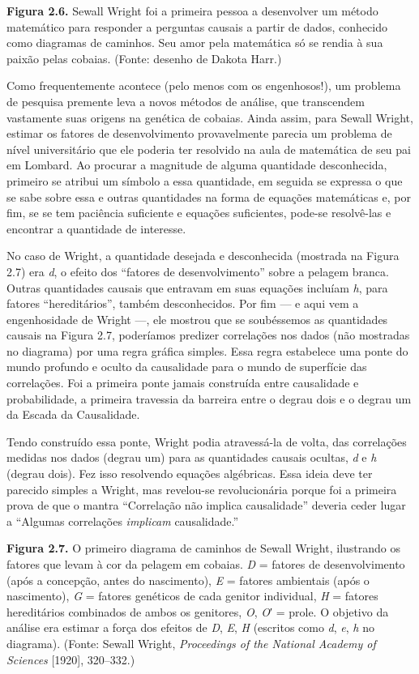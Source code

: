 \documentclass[11pt,a5paper,twoside]{book}
\begin{document}
\textbf{Figura 2.6.} Sewall Wright foi a primeira pessoa a desenvolver um método matemático para responder a perguntas causais a partir de dados, conhecido como diagramas de caminhos. Seu amor pela matemática só se rendia à sua paixão pelas cobaias. (Fonte: desenho de Dakota Harr.)

Como frequentemente acontece (pelo menos com os engenhosos!), um problema de pesquisa premente leva a novos métodos de análise, que transcendem vastamente suas origens na genética de cobaias. Ainda assim, para Sewall Wright, estimar os fatores de desenvolvimento provavelmente parecia um problema de nível universitário que ele poderia ter resolvido na aula de matemática de seu pai em Lombard. Ao procurar a magnitude de alguma quantidade desconhecida, primeiro se atribui um símbolo a essa quantidade, em seguida se expressa o que se sabe sobre essa e outras quantidades na forma de equações matemáticas e, por fim, se se tem paciência suficiente e equações suficientes, pode-se resolvê-las e encontrar a quantidade de interesse.

No caso de Wright, a quantidade desejada e desconhecida (mostrada na Figura 2.7) era \textit{d}, o efeito dos “fatores de desenvolvimento” sobre a pelagem branca. Outras quantidades causais que entravam em suas equações incluíam \textit{h}, para fatores “hereditários”, também desconhecidos. Por fim — e aqui vem a engenhosidade de Wright —, ele mostrou que se soubéssemos as quantidades causais na Figura 2.7, poderíamos predizer correlações nos dados (não mostradas no diagrama) por uma regra gráfica simples. Essa regra estabelece uma ponte do mundo profundo e oculto da causalidade para o mundo de superfície das correlações. Foi a primeira ponte jamais construída entre causalidade e probabilidade, a primeira travessia da barreira entre o degrau dois e o degrau um da Escada da Causalidade.

Tendo construído essa ponte, Wright podia atravessá-la de volta, das correlações medidas nos dados (degrau um) para as quantidades causais ocultas, \textit{d} e \textit{h} (degrau dois). Fez isso resolvendo equações algébricas. Essa ideia deve ter parecido simples a Wright, mas revelou-se revolucionária porque foi a primeira prova de que o mantra “Correlação não implica causalidade” deveria ceder lugar a “Algumas correlações \textit{implicam} causalidade.”

\textbf{Figura 2.7.} O primeiro diagrama de caminhos de Sewall Wright, ilustrando os fatores que levam à cor da pelagem em cobaias. \textit{D} = fatores de desenvolvimento (após a concepção, antes do nascimento), \textit{E} = fatores ambientais (após o nascimento), \textit{G} = fatores genéticos de cada genitor individual, \textit{H} = fatores hereditários combinados de ambos os genitores, \textit{O}, \textit{O}′ = prole. O objetivo da análise era estimar a força dos efeitos de \textit{D}, \textit{E}, \textit{H} (escritos como \textit{d}, \textit{e}, \textit{h} no diagrama). (Fonte: Sewall Wright, \textit{Proceedings of the National Academy of Sciences} [1920], 320–332.)
\end{document}
